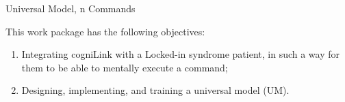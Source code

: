 
\begin{workpackage}{Universal Model, n Commands}
  \label{wp:mUcN} %



  \makewptable %
    
  \begin{wpobjectives}
    This work package has the following objectives:
    \begin{enumerate}
      \item Integrating cogniLink with a Locked-in syndrome patient, in such a way for them to be able to mentally execute a command;
      \item Designing, implementing, and training a universal model (UM).
    \end{enumerate}
  \end{wpobjectives}
  
  \begin{wpdescription}
 

    
  \end{wpdescription}
  
\begin{wpdeliverables}


\end{wpdeliverables}
\end{workpackage}
